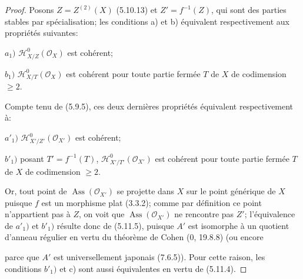 \begin{proof}
Posons $Z=Z^{(2)}(X)$ (5.10.13) et $Z'=f^{-1}(Z)$, qui sont des parties
stables par spécialisation; les conditions a) et b) équivalent
respectivement aux propriétés suivantes:

$a_1)$ $\mathscr H^0_{X/Z}(\mathscr O_X)$ est cohérent;

$b_1)$ $\mathscr H^0_{X/T}(\mathscr O_X)$ est cohérent pour toute partie
fermée $T$ de $X$ de codimension $\geqslant2$.

Compte tenu de (5.9.5), ces deux dernières propriétés équivalent
respectivement à:

$a'_1)$ $\mathscr H^0_{X'/Z'}(\mathscr O_{X'})$ est cohérent;

$b'_1)$ posant $T'=f^{-1}(T)$,
$\mathscr H^0_{X'/T'}(\mathscr O_{X'})$ est cohérent pour toute partie
fermée $T$ de $X$ de codimension $\geqslant2$.

Or, tout point de $\operatorname{Ass}(\mathscr O_{X'})$ se projette dans
$X$ sur le point générique de $X$ puisque $f$ est un morphisme plat
(3.3.2); comme par définition ce point n'appartient pas à $Z$, on voit que
$\operatorname{Ass}(\mathscr O_{X'})$ ne rencontre pas $Z'$;
l'équivalence de $a'_1)$ et $b'_1)$ résulte donc de (5.11.5), puisque $A'$
est isomorphe à un quotient d'anneau régulier en vertu du théorème de Cohen
(0, 19.8.8) (ou encore


parce que $A'$ est universellement japonais (7.6.5)). Pour cette raison,
les conditions $b'_1)$ et c) sont aussi équivalentes en vertu de (5.11.4).
\end{proof}


